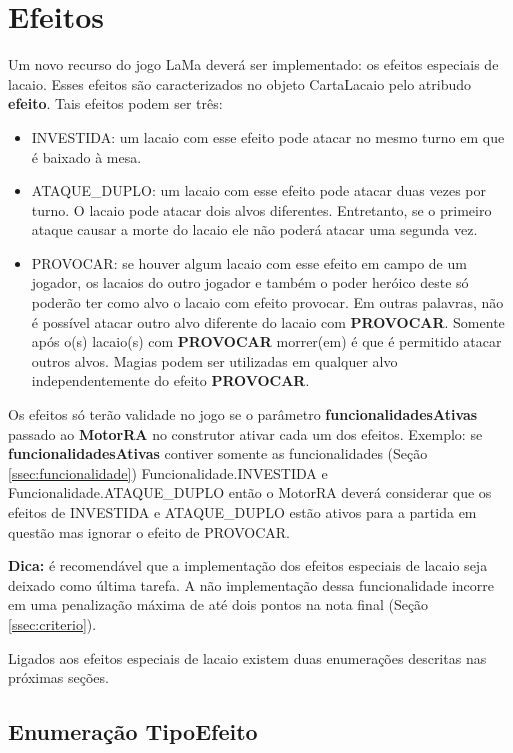 \documentclass[10pt]{article}
\begin{document}
\section{Efeitos} \label{sec:efeitos}

Um novo recurso do jogo LaMa deverá ser implementado: os efeitos especiais de lacaio. Esses efeitos são caracterizados no objeto CartaLacaio pelo atribudo \textbf{efeito}. Tais efeitos podem ser três:

\begin{itemize}
	\item INVESTIDA: um lacaio com esse efeito pode atacar no mesmo turno em que é baixado à mesa.
	\item ATAQUE\_DUPLO: um lacaio com esse efeito pode atacar duas vezes por turno. O lacaio pode atacar dois alvos diferentes. Entretanto, se o primeiro ataque causar a morte do lacaio ele não poderá atacar uma segunda vez.
	\item PROVOCAR: se houver algum lacaio com esse efeito em campo de um jogador, os lacaios do outro jogador e também o poder heróico deste só poderão ter como alvo o lacaio com efeito provocar. Em outras palavras, não é possível atacar outro alvo diferente do lacaio com \textbf{PROVOCAR}. Somente após o(s) lacaio(s) com \textbf{PROVOCAR} morrer(em) é que é permitido atacar outros alvos. Magias podem ser utilizadas em qualquer alvo independentemente do efeito \textbf{PROVOCAR}.
\end{itemize}

Os efeitos só terão validade no jogo se o parâmetro \textbf{funcionalidadesAtivas} passado ao \textbf{MotorRA} no construtor ativar cada um dos efeitos. Exemplo: se \textbf{funcionalidadesAtivas} contiver somente as funcionalidades (Seção \ref{ssec:funcionalidade}) Funcionalidade.INVESTIDA e Funcionalidade.ATAQUE\_DUPLO então o MotorRA deverá considerar que os efeitos de INVESTIDA e ATAQUE\_DUPLO estão ativos para a partida em questão mas ignorar o efeito de PROVOCAR.

\textbf{Dica:} é recomendável que a implementação dos efeitos especiais de lacaio seja deixado como última tarefa. A não implementação dessa funcionalidade incorre em uma penalização máxima de até dois pontos na nota final (Seção \ref{ssec:criterio}).

Ligados aos efeitos especiais de lacaio existem duas enumerações descritas nas próximas seções.

\subsection{Enumeração TipoEfeito}
\end{document}
